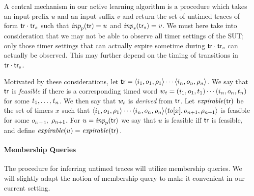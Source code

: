 A central mechanism in our active learning algorithm is a procedure which
takes  an input prefix $u$ and an input suffix $v$ and return the set of
untimed traces of form $\textsf{tr}\cdot\textsf{tr}_s$ such that
$\textit{inp}_p(\textsf{tr}) = u$ and $\textit{inp}_s(\textsf{tr}_s) = v$. We must here take into
consideration that we may not be able to observe all timer settings of the
SUT; only those timer settings that can actually expire sometime during
$\textsf{tr}\cdot\textsf{tr}_s$ can actually be observed.
This may further depend on the timing of transitions
in $\textsf{tr}\cdot\textsf{tr}_s$.


Motivated by these considerations,
let $\textsf{tr} = \langle i_1,o_1,\rho_1\rangle\cdots\langle i_n,o_n,\rho_n\rangle$.
We say that $\textsf{tr}$ is {\em feasible} if 
there is a corresponding timed word
$w_t = (i_1, o_1, t_1) \cdots (i_n, o_n, t_n)$ for some ${t}_1 , \ldots , {t}_{n}$.
We then say that $w_t$ is {\em derived} from $\textsf{tr}$.
Let $\mathit{expirable}(\textsf{tr})$ be the set of timers $x$ such that
$\langle i_1,o_1,\rho_1\rangle\cdots\langle i_n,o_n,\rho_n\rangle
\langle \mathit{to}[x],o_{n+1},\rho_{n+1}\rangle$
is feasible for some $o_{n+1}$, $\rho_{n+1}$.
For $u = \textit{inp}_p(\textsf{tr})$ we say that $u$ is feasible iff $\textsf{tr}$ is
feasible, and define $\mathit{expirable}(u) = \mathit{expirable}(\textsf{tr})$.


\paragraph{Membership Queries}
The procedure for inferring untimed traces will utilize membership queries.
We will slightly adapt the notion of membership query to make it convenient
in our current setting.

